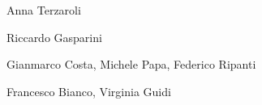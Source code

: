 \medskip

\textbf{}

Anna Terzaroli

\medskip

\textbf{}

Riccardo Gasparini

\medskip

\textbf{}

Gianmarco Costa, Michele Papa, Federico Ripanti

\textbf{}

Francesco Bianco, Virginia Guidi

